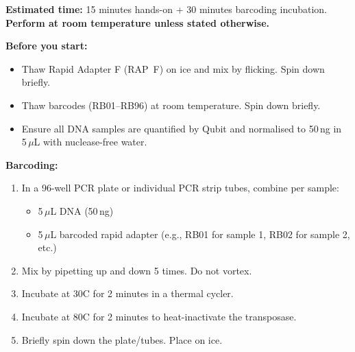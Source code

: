 \begin{protocolbox}[title={Protocol: Nanopore Rapid Barcoding (SQK-RBK114.96)}]
\textbf{Estimated time:} 15 minutes hands-on + 30 minutes barcoding incubation. \textbf{Perform at room temperature unless stated otherwise.}

\textbf{Before you start:}
\begin{itemize}[nosep]
  \item Thaw Rapid Adapter F (RAP~F) on ice and mix by flicking. Spin down briefly.
  \item Thaw barcodes (RB01--RB96) at room temperature. Spin down briefly.
  \item Ensure all DNA samples are quantified by Qubit and normalised to 50\,ng in 5\,$\mu$L with nuclease-free water.
\end{itemize}

\textbf{Barcoding:}
\begin{enumerate}[nosep]
  \item In a 96-well PCR plate or individual PCR strip tubes, combine per sample:
    \begin{itemize}[nosep]
      \item 5\,$\mu$L DNA (50\,ng)
      \item 5\,$\mu$L barcoded rapid adapter (e.g., RB01 for sample 1, RB02 for sample 2, etc.)
    \end{itemize}
  \item Mix by pipetting up and down 5 times. Do not vortex.
  \item Incubate at 30\textdegree C for 2 minutes in a thermal cycler.
  \item Incubate at 80\textdegree C for 2 minutes to heat-inactivate the transposase.
  \item Briefly spin down the plate/tubes. Place on ice.
\end{enumerate}


\end{protocolbox}

